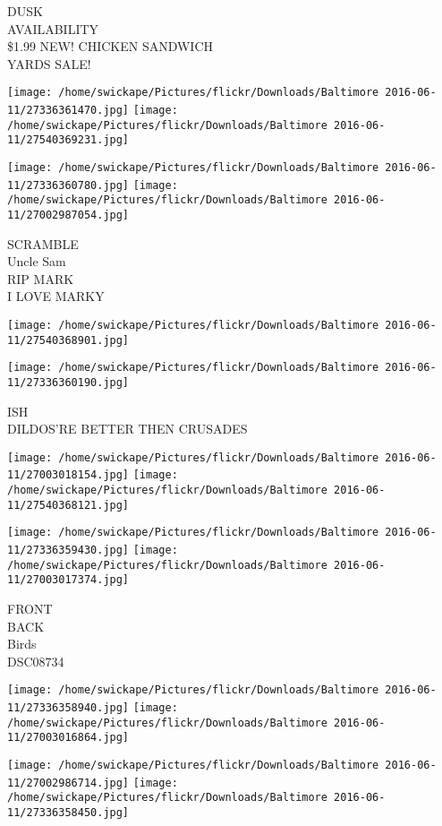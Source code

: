 \documentclass[10pt,letterpaper]{article}
\begin{document}
DUSK\\
AVAILABILITY\\
\$1.99 NEW!  CHICKEN SANDWICH\\
YARDS SALE!
\pagebreak

\texttt{[image: /home/swickape/Pictures/flickr/Downloads/Baltimore 2016-06-11/27336361470.jpg]}
\texttt{[image: /home/swickape/Pictures/flickr/Downloads/Baltimore 2016-06-11/27540369231.jpg]}

\texttt{[image: /home/swickape/Pictures/flickr/Downloads/Baltimore 2016-06-11/27336360780.jpg]}
\texttt{[image: /home/swickape/Pictures/flickr/Downloads/Baltimore 2016-06-11/27002987054.jpg]}

SCRAMBLE\\
Uncle Sam\\
RIP MARK\\
I LOVE MARKY
\pagebreak

\texttt{[image: /home/swickape/Pictures/flickr/Downloads/Baltimore 2016-06-11/27540368901.jpg]}

\vspace{0.25in}
\texttt{[image: /home/swickape/Pictures/flickr/Downloads/Baltimore 2016-06-11/27336360190.jpg]}

ISH\\
DILDOS'RE BETTER THEN CRUSADES
\pagebreak

\texttt{[image: /home/swickape/Pictures/flickr/Downloads/Baltimore 2016-06-11/27003018154.jpg]}
\texttt{[image: /home/swickape/Pictures/flickr/Downloads/Baltimore 2016-06-11/27540368121.jpg]}

\texttt{[image: /home/swickape/Pictures/flickr/Downloads/Baltimore 2016-06-11/27336359430.jpg]}
\texttt{[image: /home/swickape/Pictures/flickr/Downloads/Baltimore 2016-06-11/27003017374.jpg]}

FRONT\\
BACK\\
Birds\\
DSC08734
\pagebreak

\texttt{[image: /home/swickape/Pictures/flickr/Downloads/Baltimore 2016-06-11/27336358940.jpg]}
\texttt{[image: /home/swickape/Pictures/flickr/Downloads/Baltimore 2016-06-11/27003016864.jpg]}

\texttt{[image: /home/swickape/Pictures/flickr/Downloads/Baltimore 2016-06-11/27002986714.jpg]}
\texttt{[image: /home/swickape/Pictures/flickr/Downloads/Baltimore 2016-06-11/27336358450.jpg]}
\end{document}
